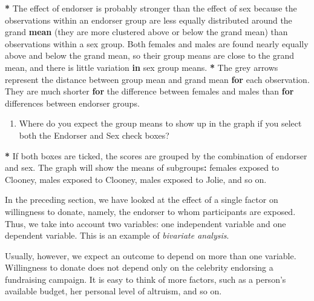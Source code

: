 \documentclass[a4paper]{book}
\newenvironment{Shaded}{\begin{snugshade}}{\end{snugshade}}
\newcommand{\KeywordTok}[1]{\textcolor[rgb]{0,0,0}{\textbf{#1}}}
\newcommand{\StringTok}[1]{\textcolor[rgb]{0.00,0.00,0.00}{#1}}
\newcommand{\ControlFlowTok}[1]{\textcolor[rgb]{0.00,0.00,0.00}{\textbf{#1}}}
\newcommand{\OperatorTok}[1]{\textcolor[rgb]{0.00,0.00,0.00}{\textbf{#1}}}
\newcommand{\NormalTok}[1]{#1}
\providecommand{\tightlist}{%
  \setlength{\itemsep}{0pt}\setlength{\parskip}{0pt}}
\theoremstyle{definition}
\theoremstyle{definition}
\theoremstyle{definition}
\theoremstyle{remark}
\begin{document}
\begin{Shaded}
\begin{Highlighting}[]
\OperatorTok{*}\StringTok{ }\NormalTok{The effect of endorser is probably stronger than the effect of sex because}
\NormalTok{the observations within an endorser group are less equally distributed around}
\NormalTok{the grand }\KeywordTok{mean}\NormalTok{ (they are more clustered above or below the grand mean) than}
\NormalTok{observations within a sex group. Both females and males are found nearly}
\NormalTok{equally above and below the grand mean, so their group means are close to the}
\NormalTok{grand mean, and there is little variation }\ControlFlowTok{in}\NormalTok{ sex group means.}
\OperatorTok{*}\StringTok{ }\NormalTok{The grey arrows represent the distance between group mean and grand mean }\ControlFlowTok{for}
\NormalTok{each observation. They are much shorter }\ControlFlowTok{for}\NormalTok{ the difference between females and}
\NormalTok{males than }\ControlFlowTok{for}\NormalTok{ differences between endorser groups.}
\end{Highlighting}
\end{Shaded}

\begin{enumerate}
\def\labelenumi{\arabic{enumi}.}
\setcounter{enumi}{2}
\tightlist
\item
  Where do you expect the group means to show up in the graph if you
  select both the Endorser and Sex check boxes?
\end{enumerate}

\begin{Shaded}
\begin{Highlighting}[]
\OperatorTok{*}\StringTok{ }\NormalTok{If both boxes are ticked, the scores are grouped by the combination of}
\NormalTok{endorser and sex. The graph will show the means of subgroups}\OperatorTok{:}\StringTok{ }\NormalTok{females exposed to}
\NormalTok{Clooney, males exposed to Clooney, males exposed to Jolie, and so on.}
\end{Highlighting}
\end{Shaded}

In the preceding section, we have looked at the effect of a single
factor on willingness to donate, namely, the endorser to whom
participants are exposed. Thus, we take into account two variables: one
independent variable and one dependent variable. This is an example of
\emph{bivariate analysis}.

Usually, however, we expect an outcome to depend on more than one
variable. Willingness to donate does not depend only on the celebrity
endorsing a fundraising campaign. It is easy to think of more factors,
such as a person's available budget, her personal level of altruism, and
so on.
\end{document}
